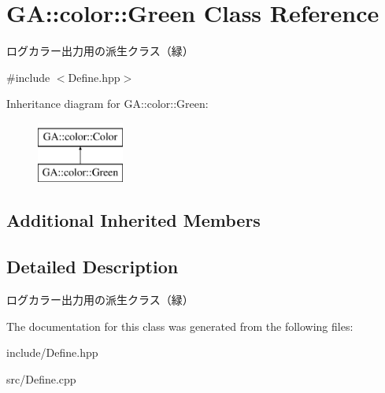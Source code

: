\hypertarget{class_g_a_1_1color_1_1_green}{}\section{GA\+::color\+::Green Class Reference}
\label{class_g_a_1_1color_1_1_green}


ログカラー出力用の派生クラス（緑）  




{\ttfamily \#include $<$Define.\+hpp$>$}

Inheritance diagram for GA\+::color\+::Green\+:\begin{figure}[H]
\begin{center}
\leavevmode
\includegraphics[height=2.000000cm]{class_g_a_1_1color_1_1_green}
\end{center}
\end{figure}
\subsection*{Additional Inherited Members}


\subsection{Detailed Description}
ログカラー出力用の派生クラス（緑） 



The documentation for this class was generated from the following files\+:\begin{DoxyCompactItemize}
\item 
include/Define.\+hpp\item 
src/Define.\+cpp\end{DoxyCompactItemize}
